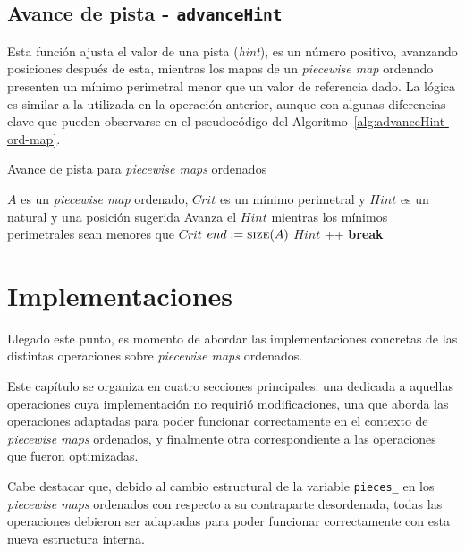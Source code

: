 \subsection{Avance de pista - \texttt{advanceHint}}

Esta función ajusta el valor de una pista (\textit{hint}), es un número positivo, avanzando posiciones después de esta, mientras los mapas de un \textit{piecewise map} ordenado presenten un mínimo perimetral menor que un valor de referencia dado. La lógica es similar a la utilizada en la operación anterior, aunque con algunas diferencias clave que pueden observarse en el pseudocódigo del Algoritmo~\ref{alg:advanceHint-ord-map}.

\begin{algorithm}
\caption{Avance de pista para \textit{piecewise maps} ordenados}
\label{alg:advanceHint-ord-map}
\begin{algorithmic}[1]
\Require $A$ es un \textit{piecewise map} ordenado, $Crit$ es un mínimo perimetral y $Hint$ es un natural y una posición sugerida
\Ensure Avanza el $Hint$ mientras los mínimos perimetrales sean menores que $Crit$
  \State $end := \Call{size}{A}$ 
      \State $Hint$ \!+\!+
    \Else
      \State \textbf{break}
    \EndIf
  \EndWhile
\EndFunction
\end{algorithmic}
\end{algorithm}


\section{Implementaciones}

Llegado este punto, es momento de abordar las implementaciones concretas de las distintas operaciones sobre \textit{piecewise maps} ordenados. 

Este capítulo se organiza en cuatro secciones principales: una dedicada a aquellas operaciones cuya implementación no requirió modificaciones, una que aborda las operaciones adaptadas para poder funcionar correctamente en el contexto de \textit{piecewise maps} ordenados, y finalmente otra correspondiente a las operaciones que fueron optimizadas.

Cabe destacar que, debido al cambio estructural de la variable \texttt{pieces\_} en los \textit{piecewise maps} ordenados con respecto a su contraparte desordenada, todas las operaciones debieron ser adaptadas para poder funcionar correctamente con esta nueva estructura interna.


